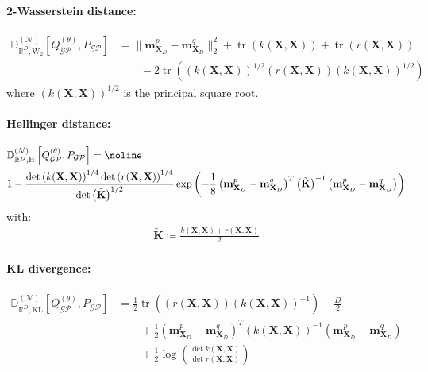 \documentclass{article}
\newcommand{\tr}{\operatorname{tr}}
\newcommand{\GP}{\operatorname{\mathcal{GP}}}
\numberwithin{equation}{section}
\begin{document}
\paragraph{2-Wasserstein distance:} 
\begin{align}
    \mathbb{D}_{\mathbb{R}^D, \text{W}_2}^{(\mathcal{N})} \left[Q_{\GP}^{(\theta)}, P_{\GP}\right] &= \|\mathbf{m}_{\mathbf{X}_D}^p - \mathbf{m}_{\mathbf{X}_D}^q\|_2^2 + \tr \left(k(\mathbf{X}, \mathbf{X})\right) + \tr \left(r(\mathbf{X}, \mathbf{X})\right) \nonumber \\
    & \qquad - 2 \tr\left(\left(k(\mathbf{X}, \mathbf{X})\right)^{1/2}\left(r(\mathbf{X}, \mathbf{X})\right)\left(k(\mathbf{X}, \mathbf{X})\right)^{1/2}\right) 
\end{align}
where $\left(k(\mathbf{X}, \mathbf{X})\right)^{1/2}$ is the principal square root.

\paragraph{Hellinger distance:} 
\begin{align}
    & \mathbb{D}_{\mathbb{R}^D, \text{H}}^{(\mathcal{N})} \left[Q_{\GP}^{(\theta)}, P_{\GP}\right] = \noline \\
    & 1 - \frac{\det\left(k(\mathbf{X}, \mathbf{X})\right)^{1/4}\det\left(r(\mathbf{X}, \mathbf{X})\right)^{1/4}}{\det\left(\tilde{\textbf{K}}\right)^{1/2}}\exp\left(-\frac{1}{8}\left(\mathbf{m}_{\mathbf{X}_D}^p - \mathbf{m}_{\mathbf{X}_D}^q\right)^T \left(\tilde{\textbf{K}}\right)^{-1}\left(\mathbf{m}_{\mathbf{X}_D}^p - \mathbf{m}_{\mathbf{X}_D}^q\right)\right)
\end{align}
with:
\begin{align}
    \tilde{\textbf{K}} \coloneqq \frac{ k(\mathbf{X}, \mathbf{X}) +  r(\mathbf{X}, \mathbf{X})}{2}
\end{align}

\paragraph{KL divergence:} 
\begin{align}
    \mathbb{D}_{\mathbb{R}^D, \text{KL}}^{(\mathcal{N})} \left[Q_{\GP}^{(\theta)}, P_{\GP}\right] &= \frac{1}{2}\tr\left(\left(r(\mathbf{X}, \mathbf{X}) \right)\left(k(\mathbf{X}, \mathbf{X})\right)^{-1}\right) -\frac{D}{2}\nonumber \\
    & \qquad  +\frac{1}{2}  \left(\mathbf{m}_{\mathbf{X}_D}^p - \mathbf{m}_{\mathbf{X}_D}^q\right)^T \left( k(\mathbf{X}, \mathbf{X})\right)^{-1}\left(\mathbf{m}_{\mathbf{X}_D}^p - \mathbf{m}_{\mathbf{X}_D}^q\right) \nonumber \\
    & \qquad + \frac{1}{2} \log\left(\frac{\det k(\mathbf{X}, \mathbf{X})}{\det r(\mathbf{X}, \mathbf{X})}\right)
\end{align}
\end{document}

